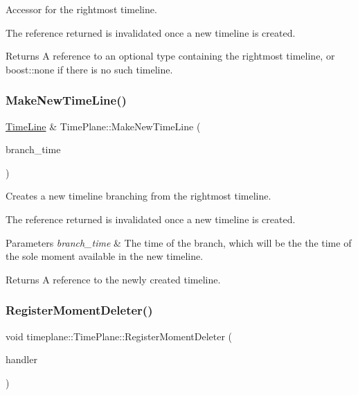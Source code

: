 Accessor for the rightmost timeline. 

The reference returned is invalidated once a new timeline is created. \begin{DoxyReturn}{Returns}
A reference to an optional type containing the rightmost timeline, or {\ttfamily boost\+::none} if there is no such timeline. 
\end{DoxyReturn}
\mbox{\label{classtimeplane_1_1_time_plane_ab8c82092c1c5c3f18c8677f8ce38662c}} 
\subsubsection{\texorpdfstring{Make\+New\+Time\+Line()}{MakeNewTimeLine()}}
{\footnotesize\ttfamily \hyperlink{classtimeplane_1_1_time_line}{Time\+Line} \& Time\+Plane\+::\+Make\+New\+Time\+Line (\begin{DoxyParamCaption}\item[{int}]{branch\+\_\+time }\end{DoxyParamCaption})}



Creates a new timeline branching from the rightmost timeline. 

The reference returned is invalidated once a new timeline is created. 
\begin{DoxyParams}{Parameters}
{\em branch\+\_\+time} & The time of the branch, which will be the the time of the sole moment available in the new timeline. \\
\hline
\end{DoxyParams}
\begin{DoxyReturn}{Returns}
A reference to the newly created timeline. 
\end{DoxyReturn}
\mbox{\label{classtimeplane_1_1_time_plane_a22be7b27d461dcb849f48c149a044502}} 
\subsubsection{\texorpdfstring{Register\+Moment\+Deleter()}{RegisterMomentDeleter()}}
{\footnotesize\ttfamily void timeplane\+::\+Time\+Plane\+::\+Register\+Moment\+Deleter (\begin{DoxyParamCaption}\item[{Moment\+Deleter\+Fn}]{handler }\end{DoxyParamCaption})\hspace{0.3cm}{\ttfamily [inline]}}



